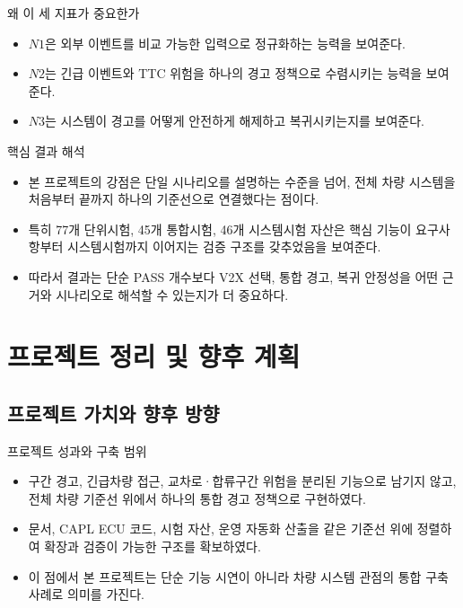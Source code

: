\documentclass[aspectratio=169,10pt]{beamer}
\begin{document}
\begin{frame}{왜 이 세 지표가 중요한가}
\begin{itemize}
  \item \(N1\)은 외부 이벤트를 비교 가능한 입력으로 정규화하는 능력을 보여준다.
  \item \(N2\)는 긴급 이벤트와 TTC 위험을 하나의 경고 정책으로 수렴시키는 능력을 보여준다.
  \item \(N3\)는 시스템이 경고를 어떻게 안전하게 해제하고 복귀시키는지를 보여준다.
\end{itemize}
\end{frame}

\begin{frame}{핵심 결과 해석}
\begin{itemize}
  \item 본 프로젝트의 강점은 단일 시나리오를 설명하는 수준을 넘어, 전체 차량 시스템을 처음부터 끝까지 하나의 기준선으로 연결했다는 점이다.
  \item 특히 77개 단위시험, 45개 통합시험, 46개 시스템시험 자산은 핵심 기능이 요구사항부터 시스템시험까지 이어지는 검증 구조를 갖추었음을 보여준다.
  \item 따라서 결과는 단순 PASS 개수보다 V2X 선택, 통합 경고, 복귀 안정성을 어떤 근거와 시나리오로 해석할 수 있는지가 더 중요하다.
\end{itemize}
\end{frame}

\section{프로젝트 정리 및 향후 계획}
\subsection{프로젝트 가치와 향후 방향}

\begin{frame}{프로젝트 성과와 구축 범위}
\begin{itemize}
  \item 구간 경고, 긴급차량 접근, 교차로·합류구간 위험을 분리된 기능으로 남기지 않고, 전체 차량 기준선 위에서 하나의 통합 경고 정책으로 구현하였다.
  \item 문서, CAPL ECU 코드, 시험 자산, 운영 자동화 산출을 같은 기준선 위에 정렬하여 확장과 검증이 가능한 구조를 확보하였다.
  \item 이 점에서 본 프로젝트는 단순 기능 시연이 아니라 차량 시스템 관점의 통합 구축 사례로 의미를 가진다.
\end{itemize}
\end{frame}
\end{document}
